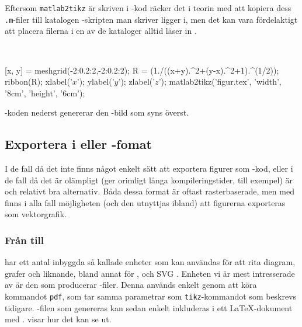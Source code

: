 \documentclass[10pt,../../a4.tex]{subfiles}
\begin{document}
Eftersom \texttt{matlab2tikz} är skriven i \MATLAB-kod räcker det i
teorin med att kopiera dess \texttt{.m}-filer till katalogen
\MATLAB-skripten man skriver ligger i, men det kan vara fördelaktigt att
placera filerna i en av de kataloger \MATLAB alltid läser in
\parencite{MATLAB13:path}.

\begin{kod}[tbp]
	\centering
	\begin{minipage}{\textwidth}
		\centering
		
	\end{minipage}
	\\[2ex]
	\begin{minipage}{\textwidth}
		\begin{matlabcode}
[x, y] = meshgrid(-2:0.2:2,-2:0.2:2);
R = (1./((x+y).^2+(y-x).^2+1).^(1/2));
ribbon(R);
xlabel('$x$'); ylabel('$y$'); zlabel('$z$');
matlab2tikz('figur.tex', 'width', '8cm', 'height', '6cm');
		\end{matlabcode}
	\end{minipage}
	\caption{\MATLAB-koden nederst genererar den \PGFTikZ-bild som
	syns överst.}
	\label{ex:matlab2tikz}
\end{kod}

\subsection{Exportera i \PDF eller \PNG-fomat}
I de fall då det inte finns något enkelt sätt att exportera figurer som
\PGFTikZ-kod, eller i de fall då det är olämpligt (ger orimligt långa
kompileringstider, till exempel) är \PDF och \PNG relativt bra alternativ.
Båda dessa format är oftast rasterbaserade, men med \PDF finns i alla 
fall möjligheten (och den utnyttjas ibland) att figurerna exporteras
som vektorgrafik.

\subsubsection{Från \texorpdfstring{\Rlogo}{R} till \texorpdfstring{\PDF}{PDF}}
\Rlogo har ett antal inbyggda så kallade enheter  som kan
användas för att rita diagram, grafer och liknande, bland annat för \EPS,
\PNG och \textsc{SVG} \parencite[\ppno~675–676]{RCoreTeam12}. Enheten vi är mest
intresserade av är den som producerar \PDF-filer. Denna används enkelt
genom att köra kommandot \texttt{pdf}, som tar samma parametrar som
\texttt{tikz}-kommandot som beskrevs tidigare. \PDF-filen som genereras
kan sedan enkelt inkluderas i ett \LaTeX-dokument med .
 visar hur det kan se ut.
\end{document}
